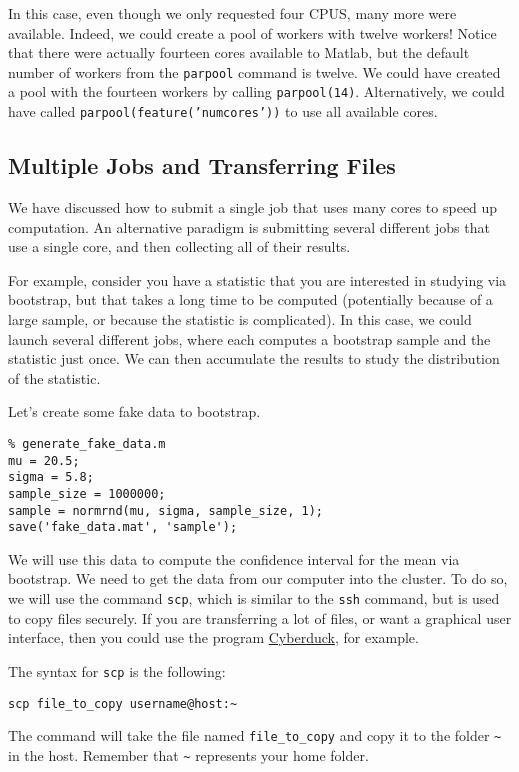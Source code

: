 \documentclass[12pt, a4paper]{article}
\begin{document}
In this case, even though we only requested four CPUS, many more were available.
Indeed, we could create a pool of workers with twelve workers!
Notice that there were actually fourteen cores available to Matlab, but the default number of workers from the \texttt{parpool} command is twelve.
We could have created a pool with the fourteen workers by calling \texttt{parpool(14)}.
Alternatively, we could have called \texttt{parpool(feature('numcores'))} to use all available cores.
\subsection{Multiple Jobs and Transferring Files}
\label{sec:org8527f2b}
We have discussed how to submit a single job that uses many cores to speed up computation.
An alternative paradigm is submitting several different jobs that use a single core, and then collecting all of their results.

For example, consider you have a statistic that you are interested in studying via bootstrap, but that takes a long time to be computed (potentially because of a large sample, or because the statistic is complicated).
In this case, we could launch several different jobs, where each computes a bootstrap sample and the statistic just once.
We can then accumulate the results to study the distribution of the statistic.

Let's create some fake data to bootstrap.
\lstset{language=matlab,label= ,caption= ,captionpos=b,firstnumber=1,numbers=left,style=Matlab-editor}
\begin{lstlisting}
% generate_fake_data.m
mu = 20.5;
sigma = 5.8;
sample_size = 1000000;
sample = normrnd(mu, sigma, sample_size, 1);
save('fake_data.mat', 'sample');
\end{lstlisting}
We will use this data to compute the confidence interval for the mean via bootstrap.
We need to get the data from our computer into the cluster.
To do so, we will use the command \texttt{scp}, which is similar to the \texttt{ssh} command, but is used to copy files securely.
If you are transferring a lot of files, or want a graphical user interface, then you could use the program \href{https://cyberduck.io}{Cyberduck}, for example.

The syntax for \texttt{scp} is the following:
\lstset{language=bash,label= ,caption= ,captionpos=b,firstnumber=1,numbers=left,style=bash}
\begin{lstlisting}
scp file_to_copy username@host:~
\end{lstlisting}
The command will take the file named \texttt{file\_to\_copy} and copy it to the folder \texttt{\textasciitilde{}} in the host.
Remember that \texttt{\textasciitilde{}} represents your home folder.
\end{document}
